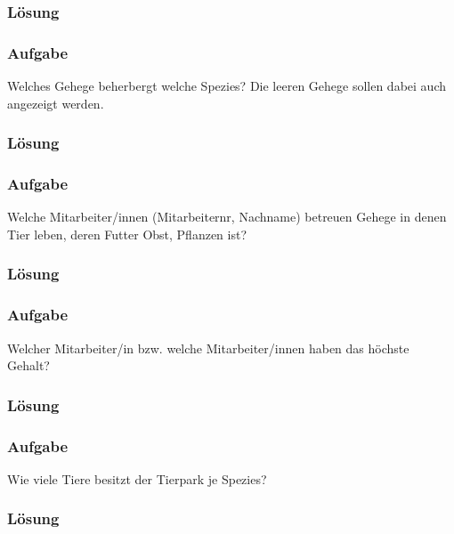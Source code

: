 \subsubsection*{Lösung}
\label{subsubsec:uebung_01.aufgabe_10b.loesung}

\subsubsection{Aufgabe}
\label{subsec:uebung_01.aufgabe_10c}
Welches Gehege beherbergt welche Spezies? Die leeren Gehege sollen dabei auch angezeigt werden.

\subsubsection*{Lösung}
\label{subsubsec:uebung_01.aufgabe_10c.loesung}

\subsubsection{Aufgabe}
\label{subsec:uebung_01.aufgabe_10d}
Welche Mitarbeiter/innen (Mitarbeiternr, Nachname) betreuen Gehege in denen Tier leben, deren Futter Obst, Pflanzen ist?

\subsubsection*{Lösung}
\label{subsubsec:uebung_01.aufgabe_10d.loesung}

\subsubsection{Aufgabe}
\label{subsec:uebung_01.aufgabe_10e}
Welcher Mitarbeiter/in bzw. welche Mitarbeiter/innen haben das höchste Gehalt?

\subsubsection*{Lösung}
\label{subsubsec:uebung_01.aufgabe_10e.loesung}

\subsubsection{Aufgabe}
\label{subsec:uebung_01.aufgabe_10f}
Wie viele Tiere besitzt der Tierpark je Spezies?

\subsubsection*{Lösung}
\label{subsubsec:uebung_01.aufgabe_10f.loesung}
